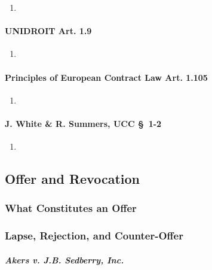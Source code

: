\begin{enumerate}
    \item %
\end{enumerate}

\paragraph{UNIDROIT Art. 1.9}

\begin{enumerate}
    \item %
\end{enumerate}

\paragraph{Principles of European Contract Law Art. 1.105}

\begin{enumerate}
    \item %
\end{enumerate}

\paragraph{J. White \& R. Summers, UCC \S\ 1-2}

\begin{enumerate}
    \item %
\end{enumerate}

\subsection{Offer and Revocation}

\subsubsection{What Constitutes an Offer}


\subsubsection{Lapse, Rejection, and Counter-Offer}

\paragraph{\emph{Akers v. J.B. Sedberry, Inc.}}


